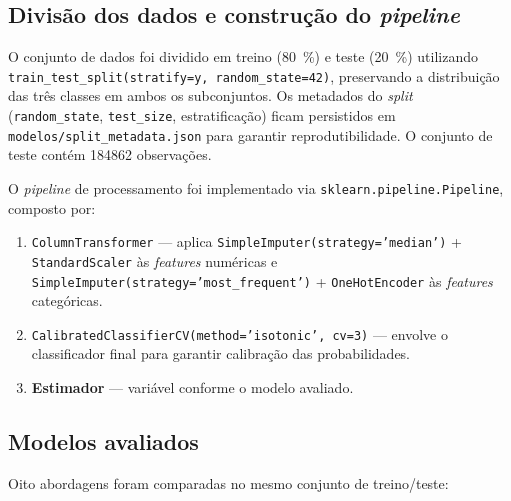 \subsection{Divisão dos dados e construção do \emph{pipeline}}

O conjunto de dados foi dividido em treino (\SI{80}{\percent}) e teste (\SI{20}{\percent}) utilizando \texttt{train\_test\_split(stratify=y, random\_state=42)}, preservando a distribuição das três classes em ambos os subconjuntos. Os metadados do \emph{split} (\texttt{random\_state}, \texttt{test\_size}, estratificação) ficam persistidos em \texttt{modelos/split\_metadata.json} para garantir reprodutibilidade. O conjunto de teste contém \num{184862} observações.

O \emph{pipeline} de processamento foi implementado via \texttt{sklearn.pipeline.Pipeline}, composto por:

\begin{enumerate}
  \item \texttt{ColumnTransformer} --- aplica \texttt{SimpleImputer(strategy='median')} + \texttt{StandardScaler} às \emph{features} numéricas e \texttt{SimpleImputer(strategy='most\_frequent')} + \texttt{OneHotEncoder} às \emph{features} categóricas.
  \item \texttt{CalibratedClassifierCV(method='isotonic', cv=3)} --- envolve o classificador final para garantir calibração das probabilidades.
  \item \textbf{Estimador} --- variável conforme o modelo avaliado.
\end{enumerate}

\subsection{Modelos avaliados}

Oito abordagens foram comparadas no mesmo conjunto de treino/teste:

